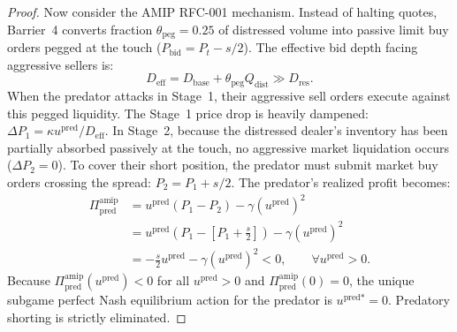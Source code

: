 \documentclass[11pt,a4paper]{article}
\theoremstyle{definition}\newtheorem{definition}[theorem]{Definition}
\theoremstyle{remark}\newtheorem{remark}[theorem]{Remark}
\begin{document}
\begin{proof}
Now consider the AMIP RFC-001 mechanism. Instead of halting quotes, Barrier~4 converts fraction $\theta_{\text{peg}} = 0.25$ of distressed volume into passive limit buy orders pegged at the touch ($P_{\text{bid}} = P_t - s/2$). The effective bid depth facing aggressive sellers is:
\begin{equation}
D_{\text{eff}} = D_{\text{base}} + \theta_{\text{peg}} Q_{\text{dist}} \gg D_{\text{res}}.
\end{equation}
When the predator attacks in Stage~1, their aggressive sell orders execute against this pegged liquidity. The Stage~1 price drop is heavily dampened: $\Delta P_1 = \kappa u^{\text{pred}} / D_{\text{eff}}$.
In Stage~2, because the distressed dealer's inventory has been partially absorbed passively at the touch, no aggressive market liquidation occurs ($\Delta P_2 = 0$). To cover their short position, the predator must submit market buy orders crossing the spread: $P_2 = P_1 + s/2$.
The predator's realized profit becomes:
\begin{align}
\Pi_{\text{pred}}^{\text{amip}} &= u^{\text{pred}} (P_1 - P_2) - \gamma (u^{\text{pred}})^2 \nonumber\\
&= u^{\text{pred}} \left( P_1 - \left[ P_1 + \frac{s}{2} \right] \right) - \gamma (u^{\text{pred}})^2 \nonumber\\
&= - \frac{s}{2} u^{\text{pred}} - \gamma (u^{\text{pred}})^2 < 0, \qquad \forall u^{\text{pred}} > 0.
\end{align}
Because $\Pi_{\text{pred}}^{\text{amip}}(u^{\text{pred}}) < 0$ for all $u^{\text{pred}} > 0$ and $\Pi_{\text{pred}}^{\text{amip}}(0) = 0$, the unique subgame perfect Nash equilibrium action for the predator is $u^{\text{pred}*} = 0$. Predatory shorting is strictly eliminated.
\end{proof}
\end{document}
